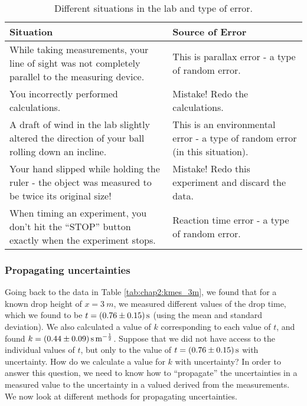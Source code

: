 \begin{table}[!h]
\centering
\begin{tabular}{p{3in}p{3in}} 
\textbf{Situation} &\textbf{Source of Error} \\
\hline
\hline
While taking measurements, your line of sight was not completely parallel to the measuring device. & This is parallax error - a type of random error.\\ \hline
You incorrectly performed calculations. & Mistake! Redo the calculations.\\ \hline
A draft of wind in the lab slightly altered the direction of your ball rolling down an incline. & This is an environmental error - a type of random error (in this situation).\\ \hline
Your hand slipped while holding the ruler - the object was measured to be twice its original size! & Mistake! Redo this experiment and discard the data.\\ \hline
When timing an experiment, you don't hit the ``STOP'' button exactly when the experiment stops. & Reaction time error - a type of random error.\\ \hline
\end{tabular}
\caption{\label{tab:chap2:uncertainties} Different situations in the lab and type of error.}
\end{table}

\subsubsection{Propagating uncertainties}
Going back to the data in Table \ref{tab:chap2:kmes_3m}, we found that for a known drop height of $x=\SI{3}{m}$, we measured different values of the drop time, which we found to be $t=\SI{0.76 \pm 0.15}{s}$ (using the mean and standard deviation). We also calculated a value of $k$ corresponding to each value of $t$, and found $k=\SI{0.44 \pm 0.09}{s.m^{-\frac{1}{2}}}$. Suppose that we did not have access to the individual values of $t$, but only to the value of $t=\SI{0.76 \pm 0.15}{s}$ with uncertainty. How do we calculate a value for $k$ with uncertainty? In order to answer this question, we need to know how to ``propagate'' the uncertainties in a measured value to the uncertainty in a valued derived from the measurements. We now look at different methods for propagating uncertainties.

